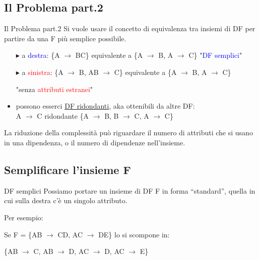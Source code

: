 \documentclass{beamer}
\begin{document}
\subsection{Il Problema part.2}
\begin{frame}{Il Problema part.2}
    Si vuole usare il concetto di equivalenza tra insiemi di DF per partire da una F più semplice possibile.
    \begin{itemize}
        \item[$\blacktriangleright$] a \textcolor{blue}{destra}:
        \{A $\rightarrow$ BC\} equivalente a \{A $\rightarrow$ B, A $\rightarrow$ C\} "\textcolor{blue}{DF semplici}"
        \item[$\blacktriangleright$] a \textcolor{red}{sinistra}:
        \{A $\rightarrow$ B, AB $\rightarrow$ C\} equivalente a \{A $\rightarrow$ B, A $\rightarrow$ C\} \par
        \hspace{7cm} "senza \textcolor{red}{attributi estranei}"
        \item possono esserci \underline{DF ridondanti}, aka ottenibili da altre DF:\\
        A $\rightarrow$ C ridondante \{A $\rightarrow$ B, B $\rightarrow$ C, A $\rightarrow$ C\}
    \end{itemize}
    \vfill
    \begin{block}{}
    La riduzione della complessità può riguardare il numero di attributi che si usano in una dipendenza, o il numero di dipendenze nell'insieme.
    \end{block}
\end{frame}

\subsection{Semplificare l'insieme F}
\begin{frame}{DF semplici}
    Possiamo portare un insieme di DF F in forma “standard”, quella in cui sulla destra c’è un singolo attributo.\par
    \vfill
    Per esempio:\par
    Se F = \{AB $\rightarrow$ CD, AC $\rightarrow$ DE\} lo si scompone in:\par
            \hspace{1cm}  \{AB $\rightarrow$ C, AB $\rightarrow$ D, AC $\rightarrow$ D, AC $\rightarrow$ E\} 
    
\end{frame}
\end{document}
